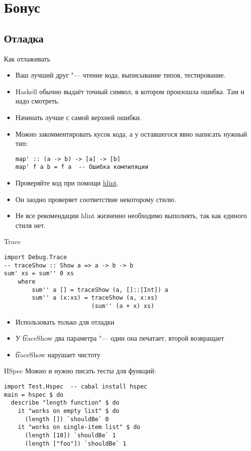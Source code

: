 \section{Бонус}
\subsection{Отладка}

\begin{frame}
\end{frame}

\begin{frame}[fragile]{Как отлаживать}
	\begin{itemize}
		\item Ваш лучший друг "--- чтение кода, выписывание типов, тестирование.
		\item Haskell обычно выдаёт точный символ, в котором произошла ошибка. Там и надо смотреть.
		\item Начинать лучше с самой верхней ошибки.
		\item Можно закомментировать кусок кода, а у оставшегося явно написать нужный тип:
\begin{verbatim}
map' :: (a -> b) -> [a] -> [b]
map' f a b = f a  -- Ошибка компиляции
\end{verbatim}
		\item Проверяйте код при помощи \href{https://hackage.haskell.org/package/hlint}{hlint}.
		\item Он заодно проверяет соответствие некоторому стилю.
		\item Не все рекомендации hlint жизненно необходимо выполнять, так как единого стиля нет.
	\end{itemize}
\end{frame}

\begin{frame}[fragile]{Trace}
\begin{verbatim}
import Debug.Trace
-- traceShow :: Show a => a -> b -> b
sum' xs = sum'' 0 xs
    where
        sum'' a [] = traceShow (a, []::[Int]) a
        sum'' a (x:xs) = traceShow (a, x:xs)
                         (sum'' (a + x) xs)
\end{verbatim}
	\begin{itemize}
		\item Использовать только для отладки
		\item У \t{traceShow} два параметра "--- один она печатает, второй возвращает
		\item \t{traceShow} нарушает чистоту
	\end{itemize}
\end{frame}

\begin{frame}[fragile]{HSpec}
	Можно и нужно писать тесты для функций:
\begin{verbatim}
import Test.Hspec  -- cabal install hspec
main = hspec $ do
  describe "length function" $ do
    it "works on empty list" $ do
      (length []) `shouldBe` 0
    it "works on single-item list" $ do
      (length [10]) `shouldBe` 1
      (length ["foo"]) `shouldBe` 1
\end{verbatim}
\end{frame}
